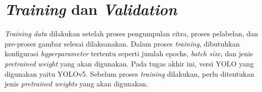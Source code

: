 

\section{\textit{Training} dan \textit{Validation}}
\label{sec:trainvaldata}

\textit{Training data} dilakukan setelah proses pengumpulan citra, proses pelabelan, dan pre-proses gambar selesai dilaksanakan. Dalam proses \textit{training}, dibutuhkan konfigurasi \textit{hyperparameter} tertentu seperti jumlah epochs, \textit{batch size}, dan jenis \textit{pretrained weight} yang akan digunakan. Pada tugas akhir ini, versi YOLO yang digunakan yaitu YOLOv5. Sebelum proses \textit{training} dilakukan, perlu ditentukan jenis \textit{pretrained weights} yang akan digunakan. \par

